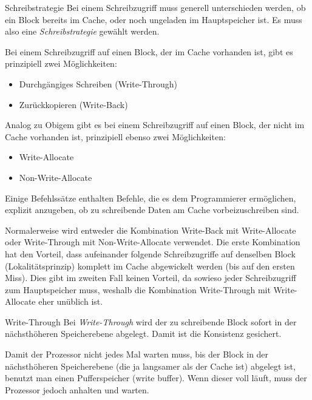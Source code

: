 \begin{defi}{Schreibstrategie}
    Bei einem Schreibzugriff muss generell unterschieden werden, ob ein Block bereits im Cache, oder noch ungeladen im Hauptspeicher ist.
    Es muss also eine \emph{Schreibstrategie} gewählt werden.

    Bei einem Schreibzugriff auf einen Block, der im Cache vorhanden ist, gibt es prinzipiell zwei Möglichkeiten:
    \begin{itemize}
        \item Durchgängiges Schreiben (Write-Through)
        \item Zurückkopieren (Write-Back)
    \end{itemize}

    Analog zu Obigem gibt es bei einem Schreibzugriff auf einen Block, der nicht im Cache vorhanden ist, prinzipiell ebenso zwei Möglichkeiten:
    \begin{itemize}
        \item Write-Allocate
        \item Non-Write-Allocate
    \end{itemize}

    Einige Befehlssätze enthalten Befehle, die es dem Programmierer ermöglichen, explizit anzugeben, ob zu schreibende Daten am Cache vorbeizuschreiben sind.

    Normalerweise wird entweder die Kombination Write-Back mit Write-Allocate oder Write-Through mit Non-Write-Allocate verwendet.
    Die erste Kombination hat den Vorteil, dass aufeinander folgende Schreibzugriffe auf denselben Block (Lokalitätsprinzip) komplett im Cache abgewickelt werden (bis auf den ersten Miss).
    Dies gibt im zweiten Fall keinen Vorteil, da sowieso jeder Schreibzugriff zum Hauptspeicher muss, weshalb die Kombination Write-Through mit Write-Allocate eher unüblich ist.
\end{defi}

\begin{defi}[Schreibstrategie]{Write-Through}
    Bei \emph{Write-Through} wird der zu schreibende Block sofort in der nächsthöheren Speicherebene abgelegt.
    Damit ist die Konsistenz gesichert.

    Damit der Prozessor nicht jedes Mal warten muss, bis der Block in der nächsthöheren Speicherebene (die ja langsamer als der Cache ist) abgelegt ist, benutzt man einen Pufferspeicher (write buffer).
    Wenn dieser voll läuft, muss der Prozessor jedoch anhalten und warten.
\end{defi}

